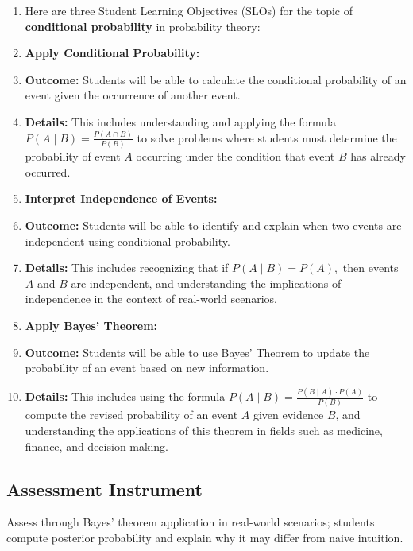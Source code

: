 \begin{enumerate}
    \item Here are three Student Learning Objectives (SLOs) for the topic of \textbf{conditional probability} in probability theory:
    \item \textbf{Apply Conditional Probability:}
    \item \textbf{Outcome:} Students will be able to calculate the conditional probability of an event given the occurrence of another event.
    \item \textbf{Details:} This includes understanding and applying the formula $P(A \mid B) = \frac{P(A \cap B)}{P(B)}$ to solve problems where students must determine the probability of event $A$ occurring under the condition that event $B$ has already occurred.
    \item \textbf{Interpret Independence of Events:}
    \item \textbf{Outcome:} Students will be able to identify and explain when two events are independent using conditional probability.
    \item \textbf{Details:} This includes recognizing that if $P(A \mid B) = P(A),$ then events $A$ and $B$ are independent, and understanding the implications of independence in the context of real-world scenarios.
    \item \textbf{Apply Bayes' Theorem:}
    \item \textbf{Outcome:} Students will be able to use Bayes' Theorem to update the probability of an event based on new information.
    \item \textbf{Details:} This includes using the formula $P(A \mid B) = \frac{P(B \mid A) \cdot P(A)}{P(B)}$ to compute the revised probability of an event $A$ given evidence $B$, and understanding the applications of this theorem in fields such as medicine, finance, and decision-making.
\end{enumerate}


\subsection{Assessment Instrument}
\label{ssec:asse-3669}


Assess through Bayes' theorem application in real-world scenarios;
students compute posterior probability and explain why it may differ from
naive intuition.

